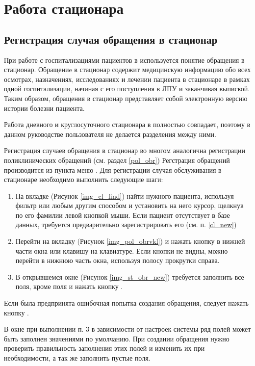 \newpage
\section{Работа стационара}

\subsection{Регистрация случая обращения в стационар}
При работе с госпитализациями пациентов в \tmis используется понятие обращения в стационар. Обращениe в стационар содержит медицинскую информацию обо всех осмотрах, назначениях, исследованиях и лечении пациента в стационаре в рамках одной госпитализации, начиная с его поступления в ЛПУ и заканчивая выпиской. Таким образом, обращения в стационар представляет собой электронную версию истории болезни пациента.

Работа дневного и круглосуточного стационара в \tmis полностью совпадает, поэтому в данном руководстве пользователя не делается разделения между ними.

Регистрация случаев обращения в стационар во многом аналогична регистрации поликлинических обращений (см. раздел \ref{pol_obr}) Регстрация обращений производится из пункта меню . Для регистрации случая обслуживания в стационаре необходимо выполнить следующие шаги:
\begin{enumerate}
 \item На вкладке  (Рисунок \ref{img_cl_find}) найти нужного пациента, используя фильтр или любым другим способом и установить на него курсор, щелкнув по его фамилии левой кнопкой мыши. Если пациент отсутствует в базе данных, требуется предварительно зарегистрировать его (см. п. \ref{cl_new})
 \item Перейти на вкладку  (Рисунок \ref{img_pol_obrvkl}) и нажать кнопку   в нижней части окна или клавишу  на клавиатуре. Если кнопки не видны, можно перейти в нижнюю часть окна, используя полосу прокрутки справа.
 \item В открывшемся окне  (Рисунок \ref{img_st_obr_new}) требуется заполнить все поля, кроме поля  и нажать кнопку .
\end{enumerate}
 
Если была предпринята ошибочная попытка создания обращения, следует нажать кнопку .
 
В окне  при выполнении п. 3 в зависимости от настроек системы ряд полей может быть заполнен значениями по умолчанию. При создании обращения нужно проверить правильность заполнения этих полей и изменить их при необходимости, а так же заполнить пустые поля.

